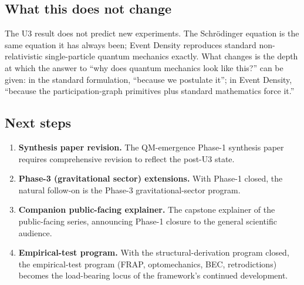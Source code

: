 \documentclass[11pt,a4paper]{article}
\begin{document}
\subsection{What this does not change}

The U3 result does not predict new experiments. The Schr\"odinger equation is the same equation it has always been; Event Density reproduces standard non-relativistic single-particle quantum mechanics exactly. What changes is the depth at which the answer to ``why does quantum mechanics look like this?'' can be given: in the standard formulation, ``because we postulate it''; in Event Density, ``because the participation-graph primitives plus standard mathematics force it.''

\subsection{Next steps}

\begin{enumerate}
  \item \textbf{Synthesis paper revision.} The QM-emergence Phase-1 synthesis paper requires comprehensive revision to reflect the post-U3 state.
  \item \textbf{Phase-3 (gravitational sector) extensions.} With Phase-1 closed, the natural follow-on is the Phase-3 gravitational-sector program.
  \item \textbf{Companion public-facing explainer.} The capstone explainer of the public-facing series, announcing Phase-1 closure to the general scientific audience.
  \item \textbf{Empirical-test program.} With the structural-derivation program closed, the empirical-test program (FRAP, optomechanics, BEC, retrodictions) becomes the load-bearing locus of the framework's continued development.
\end{enumerate}
\end{document}
